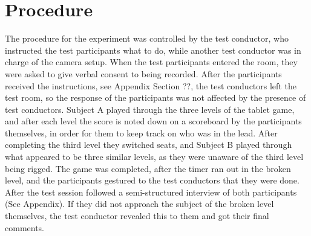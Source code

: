\section{Procedure}
The procedure for the experiment was controlled by the test conductor, who instructed the test participants what to do, while another test conductor was in charge of the camera setup. When the test participants entered the room, they were asked to give verbal consent to being recorded. After the participants received the instructions, see Appendix Section ??, the test conductors left the test room, so the response of the participants was not affected by the presence of test conductors. Subject A played through the three levels of the tablet game, and after each level the score is noted down on a scoreboard by the participants themselves, in order for them to keep track on who was in the lead. After completing the third level they switched seats, and Subject B played through what appeared to be three similar levels, as they were unaware of the third level being rigged. The game was completed, after the timer ran out in the broken level, and the participants gestured to the test conductors that they were done. After the test session followed a semi-structured interview of both participants (See Appendix). If they did not approach the subject of the broken level themselves, the test conductor revealed this to them and got their final comments. 

